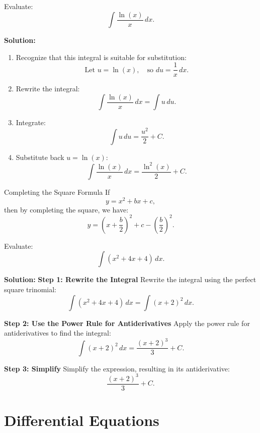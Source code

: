 \documentclass[12pt]{article}
\theoremstyle{beautifulthm}
\begin{document}
\begin{tcolorbox}[colback=examplebg, colframe=red!75!black, title=\textbf{EXAMPLE 4: Find the Integral of the Function}, fonttitle=\bfseries, sharp corners]

Evaluate:
\[
\int \frac{\ln(x)}{x} \, dx.
\]

\tcblower
\textbf{Solution:} 
\begin{enumerate}
    \item Recognize that this integral is suitable for substitution:
    \[
    \text{Let } u = \ln(x), \quad \text{so } du = \frac{1}{x} \, dx.
    \]
    \item Rewrite the integral:
    \[
    \int \frac{\ln(x)}{x} \, dx = \int u \, du.
    \]
    \item Integrate:
    \[
    \int u \, du = \frac{u^2}{2} + C.
    \]
    \item Substitute back \( u = \ln(x) \):
    \[
    \int \frac{\ln(x)}{x} \, dx = \frac{\ln^2(x)}{2} + C.
    \]
\end{enumerate}
\end{tcolorbox}


\newpage

\begin{mytheorem}{Completing the Square Formula}{}
    If 
\[
y = x^2 + bx + c,
\]
then by completing the square, we have:
\[
y = \left(x + \frac{b}{2}\right)^2 + c - \left(\frac{b}{2}\right)^2.
\]
\end{mytheorem}


\begin{tcolorbox}[colback=examplebg, colframe=red!75!black, title=\textbf{EXAMPLE 5: Find the Integral of the Function}, fonttitle=\bfseries, sharp corners]
Evaluate:
\[
\int (x^2 + 4x + 4) \, dx.
\]


\tcblower
\textbf{Solution:} 
\textbf{Step 1: Rewrite the Integral}  
Rewrite the integral using the perfect square trinomial:
\[
\int (x^2 + 4x + 4) \, dx = \int (x + 2)^2 \, dx.
\]

\textbf{Step 2: Use the Power Rule for Antiderivatives}  
Apply the power rule for antiderivatives to find the integral:
\[
\int (x + 2)^2 \, dx = \frac{(x + 2)^3}{3} + C.
\]

\textbf{Step 3: Simplify}  
Simplify the expression, resulting in its antiderivative:
\[
\frac{(x + 2)^3}{3} + C.
\]
\end{tcolorbox}




\newpage

\section{Differential Equations}
\end{document}

